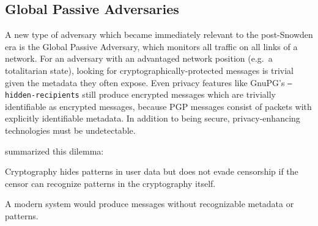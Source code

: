 \subsection{Global Passive Adversaries}\label{subsec:global-passive-adversaries}

A new type of adversary which became immediately relevant to the post-Snowden era is the Global
Passive Adversary, which monitors all traffic on all links of a network. For an adversary with an
advantaged network position (e.g.\ a totalitarian state), looking for cryptographically-protected
messages is trivial given the metadata they often expose. Even privacy features like GnuPG's
\texttt{--hidden-recipients} still produce encrypted messages which are trivially identifiable as
encrypted messages, because PGP messages consist of packets with explicitly identifiable metadata.
In addition to being secure, privacy-enhancing technologies must be undetectable.

\textcite{bernstein2013} summarized this dilemma:

\begin{displayquote}
    Cryptography hides patterns in user data but does not evade censorship if the censor can
    recognize patterns in the cryptography itself.
\end{displayquote}

A modern system would produce messages without recognizable metadata or patterns.
